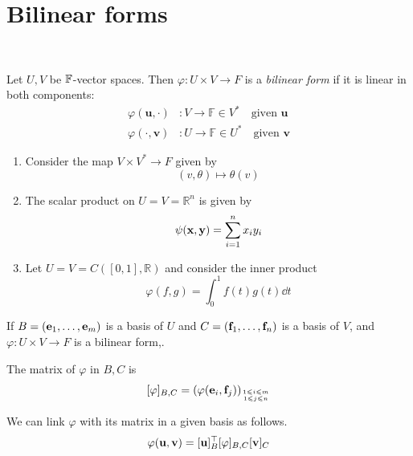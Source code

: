 \documentclass[a4paper]{article}
\begin{document}
\section{Bilinear forms}\ \vspace{-1.5em}
\begin{definition}
	Let $ U, V $ be $ {\mathbb{F}} $-vector spaces.
	Then $ \varphi \colon U \times V \to F $ is a \textit{bilinear form} if it is linear in both components:
    \begin{align*}
        \varphi(\mathbf{u},\cdot)&: V \to \mathbb{F} \in V^* \quad \text{given }\mathbf{u}\\
        \varphi(\cdot, \mathbf{v})&: U \to \mathbb{F} \in U^* \quad \text{given }\mathbf{v}
    \end{align*}
\end{definition}

\begin{example}
	\begin{enumerate}
        \item Consider the map $ V \times V^* \to F $ given by
        \[
            (v, \theta) \mapsto \theta(v)
        \]
    
        \item The scalar product on $ U = V = \mathbb R^n $ is given by
        \[
            \psi({\bf x}, {\bf y}) = \sum_{i=1}^n x_i y_i
        \]
    
        \item Let $ U = V = C([0,1], \mathbb R) $ and consider the inner product
        \[
            \varphi(f,g) = \int_0^1 f(t)g(t) \dd{t}
        \]
    \end{enumerate}
\end{example}

\begin{definition}
	If $ B = ({\bf e}_1, \dots, {\bf e}_m) $ is a basis of $ U $ and $ C = ({\bf f}_1, \dots, {\bf f}_n) $ is a basis of $ V $, and $ \varphi \colon U \times V \to F $ is a bilinear form,.
    
    The matrix of $ \varphi $ in $B,C$ is
	\[
		[\varphi]_{B, C} = \qty( \varphi({\bf e}_i, {\bf f}_j) )_{1 \leqslant i \leqslant m\atop 1 \leqslant j \leqslant n}
	\]
\end{definition}

\begin{lemma}
	We can link $ \varphi $ with its matrix in a given basis as follows.
	\[
		\varphi({\bf u},{\bf v}) = [{\bf u}]_B^\top [\varphi]_{B, C} [{\bf v}]_C
	\]
\end{lemma}
\end{document}
